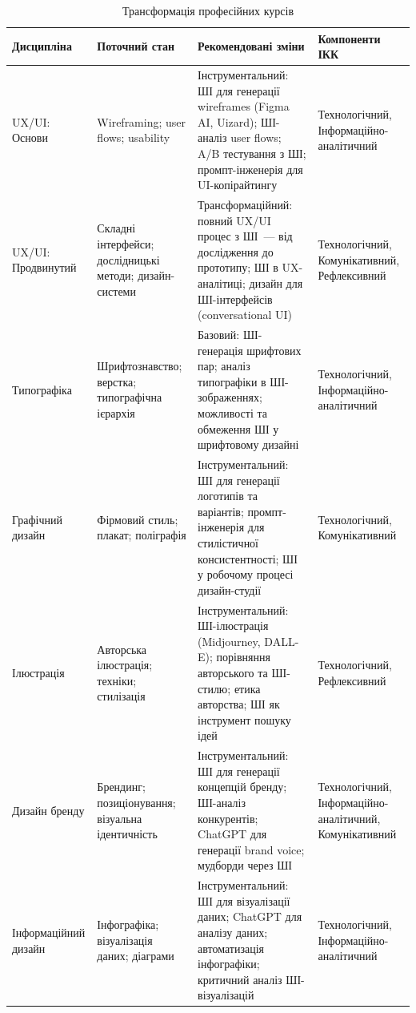\begin{table}[htbp]
\centering
\caption{Трансформація професійних курсів}\label{tab:professional-transform}
\small
\begin{tabularx}{\textwidth}{@{}p{}p{}p{}p{}@{}}
\toprule
\textbf{Дисципліна} & \textbf{Поточний стан} & \textbf{Рекомендовані зміни} & \textbf{Компоненти ІКК} \\
\midrule
UX/UI: Основи & Wireframing; user flows; usability & Інструментальний: ШІ для генерації wireframes (Figma AI, Uizard); ШІ-аналіз user flows; A/B тестування з ШІ; промпт-інженерія для UI-копірайтингу & Технологічний, Інформаційно-аналітичний \\
\addlinespace
UX/UI: Продвинутий & Складні інтерфейси; дослідницькі методи; дизайн-системи & Трансформаційний: повний UX/UI процес з ШІ~--- від дослідження до прототипу; ШІ в UX-аналітиці; дизайн для ШІ-інтерфейсів (conversational UI) & Технологічний, Комунікативний, Рефлексивний \\
\addlinespace
Типографіка & Шрифтознавство; верстка; типографічна ієрархія & Базовий: ШІ-генерація шрифтових пар; аналіз типографіки в ШІ-зображеннях; можливості та обмеження ШІ у шрифтовому дизайні & Технологічний, Інформаційно-аналітичний \\
\addlinespace
Графічний дизайн & Фірмовий стиль; плакат; поліграфія & Інструментальний: ШІ для генерації логотипів та варіантів; промпт-інженерія для стилістичної консистентності; ШІ у робочому процесі дизайн-студії & Технологічний, Комунікативний \\
\addlinespace
Ілюстрація & Авторська ілюстрація; техніки; стилізація & Інструментальний: ШІ-ілюстрація (Midjourney, DALL-E); порівняння авторського та ШІ-стилю; етика авторства; ШІ як інструмент пошуку ідей & Технологічний, Рефлексивний \\
\addlinespace
Дизайн бренду & Брендинг; позиціонування; візуальна ідентичність & Інструментальний: ШІ для генерації концепцій бренду; ШІ-аналіз конкурентів; ChatGPT для генерації brand voice; мудборди через ШІ & Технологічний, Інформаційно-аналітичний, Комунікативний \\
\addlinespace
Інформаційний дизайн & Інфографіка; візуалізація даних; діаграми & Інструментальний: ШІ для візуалізації даних; ChatGPT для аналізу даних; автоматизація інфографіки; критичний аналіз ШІ-візуалізацій & Технологічний, Інформаційно-аналітичний \\
\bottomrule
\end{tabularx}
\end{table}

